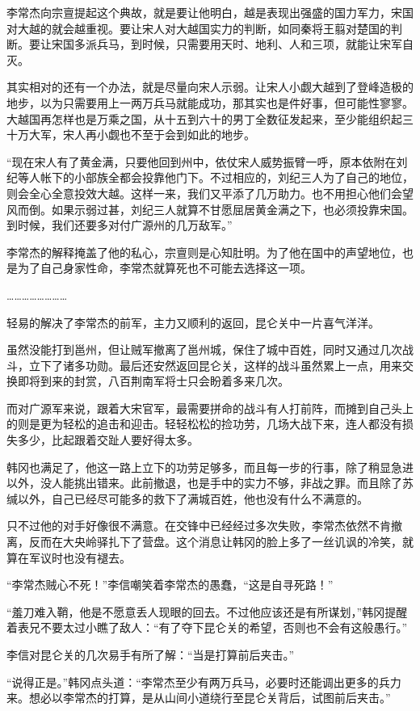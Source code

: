 李常杰向宗亶提起这个典故，就是要让他明白，越是表现出强盛的国力军力，宋国对大越的就会越重视。要让宋人对大越国实力的判断，如同秦将王翦对楚国的判断。要让宋国多派兵马，到时候，只需要用天时、地利、人和三项，就能让宋军自灭。

其实相对的还有一个办法，就是尽量向宋人示弱。让宋人小觑大越到了登峰造极的地步，以为只需要用上一两万兵马就能成功，那其实也是件好事，但可能性寥寥。大越国再怎样也是万乘之国，从十五到六十的男丁全数征发起来，至少能组织起三十万大军，宋人再小觑也不至于会到如此的地步。

“现在宋人有了黄金满，只要他回到州中，依仗宋人威势振臂一呼，原本依附在刘纪等人帐下的小部族全都会投靠他门下。不过相应的，刘纪三人为了自己的地位，则会全心全意投效大越。这样一来，我们又平添了几万助力。也不用担心他们会望风而倒。如果示弱过甚，刘纪三人就算不甘愿屈居黄金满之下，也必须投靠宋国。到时候，我们还要多对付广源州的几万敌军。”

李常杰的解释掩盖了他的私心，宗亶则是心知肚明。为了他在国中的声望地位，也是为了自己身家性命，李常杰就算死也不可能去选择这一项。

……………………

轻易的解决了李常杰的前军，主力又顺利的返回，昆仑关中一片喜气洋洋。

虽然没能打到邕州，但让贼军撤离了邕州城，保住了城中百姓，同时又通过几次战斗，立下了诸多功勋。最后还安然返回昆仑关，这样的战斗虽然累上一点，用来交换即将到来的封赏，八百荆南军将士只会盼着多来几次。

而对广源军来说，跟着大宋官军，最需要拼命的战斗有人打前阵，而摊到自己头上的则是更为轻松的追击和迎击。轻轻松松的捡功劳，几场大战下来，连人都没有损失多少，比起跟着交趾人要好得太多。

韩冈也满足了，他这一路上立下的功劳足够多，而且每一步的行事，除了稍显急进以外，没人能挑出错来。此前撤退，也是手中的实力不够，非战之罪。而且除了苏缄以外，自己已经尽可能多的救下了满城百姓，他也没有什么不满意的。

只不过他的对手好像很不满意。在交锋中已经经过多次失败，李常杰依然不肯撤离，反而在大央岭驿扎下了营盘。这个消息让韩冈的脸上多了一丝讥讽的冷笑，就算在军议时也没有褪去。

“李常杰贼心不死！”李信嘲笑着李常杰的愚蠢，“这是自寻死路！”

“羞刀难入鞘，他是不愿意丢人现眼的回去。不过他应该还是有所谋划，”韩冈提醒着表兄不要太过小瞧了敌人：“有了夺下昆仑关的希望，否则也不会有这般愚行。”

李信对昆仑关的几次易手有所了解：“当是打算前后夹击。”

“说得正是。”韩冈点头道：“李常杰至少有两万兵马，必要时还能调出更多的兵力来。想必以李常杰的打算，是从山间小道绕行至昆仑关背后，试图前后夹击。”

